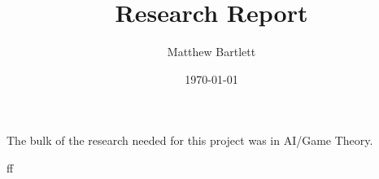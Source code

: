 \documentclass[12pt]{article}
\begin{document}
	\author{Matthew Bartlett}
	\title{Research Report}
	\date{\today}
	\maketitle

	\begin{paragraph}
		\qquad The bulk of the research needed for this project was in AI/Game Theory.
	\end{paragraph}

	\begin{paragraph}
		ff\cite{GameTheory}
	\end{paragraph}


	\printbibliography{}
\end{document}

